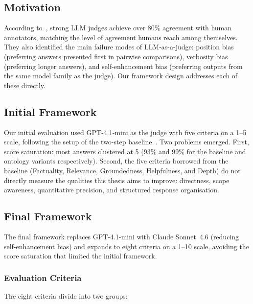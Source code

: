 \subsection{Motivation}
\label{subsec:motivation}

According to~\citet{zheng2023judging}, strong LLM judges achieve over 80\% agreement with human annotators, matching the level of agreement humans reach among themselves. They also identified the main failure modes of LLM-as-a-judge: position bias (preferring answers presented first in pairwise comparisons), verbosity bias (preferring longer answers), and self-enhancement bias (preferring outputs from the same model family as the judge). Our framework design addresses each of these directly.

\subsection{Initial Framework}
\label{sec:initial-framework}

Our initial evaluation used GPT-4.1-mini as the judge with five criteria on a 1--5 scale, following the setup of the two-step baseline~\citep{elbaff2025earthobservationrag}. Two problems emerged. First, score saturation: most answers clustered at 5 (93\% and 99\% for the baseline and ontology variants respectively). Second, the five criteria borrowed from the baseline (Factuality, Relevance, Groundedness, Helpfulness, and Depth) do not directly measure the qualities this thesis aims to improve: directness, scope awareness, quantitative precision, and structured response organisation.

\subsection{Final Framework}
\label{sec:final-framework}

The final framework replaces GPT-4.1-mini with Claude Sonnet~4.6 (reducing self-enhancement bias) and expands to eight criteria on a 1--10 scale, avoiding the score saturation that limited the initial framework.

\subsubsection{Evaluation Criteria}
\label{subsubsec:criteria}

The eight criteria divide into two groups:

